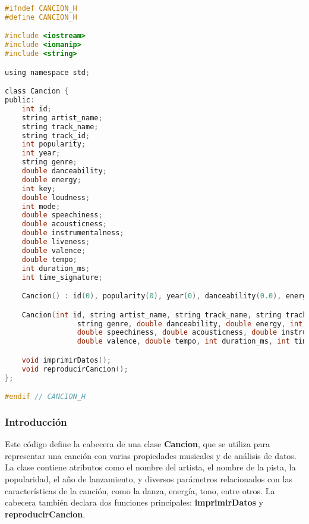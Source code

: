 \documentclass[corference]{IEEEtran}
\begin{document}
\begin{flushleft}
            \begin{lstlisting}[language=C, style=mystyle, caption={Cabecera de la Clase Canción}]
#ifndef CANCION_H
#define CANCION_H

#include <iostream>
#include <iomanip>
#include <string>

using namespace std;

class Cancion {
public:
    int id;
    string artist_name;
    string track_name;
    string track_id;
    int popularity;
    int year;
    string genre;
    double danceability;
    double energy;
    int key;
    double loudness;
    int mode;
    double speechiness;
    double acousticness;
    double instrumentalness;
    double liveness;
    double valence;
    double tempo;
    int duration_ms;
    int time_signature;

    Cancion() : id(0), popularity(0), year(0), danceability(0.0), energy(0.0), key(0), loudness(0.0), mode(0), speechiness(0.0), acousticness(0.0), instrumentalness(0.0), liveness(0.0), valence(0.0), tempo(0.0), duration_ms(0), time_signature(0) {}

    Cancion(int id, string artist_name, string track_name, string track_id, int popularity, int year,
                 string genre, double danceability, double energy, int key, double loudness, int mode,
                 double speechiness, double acousticness, double instrumentalness, double liveness,
                 double valence, double tempo, int duration_ms, int time_signature);

    void imprimirDatos();
    void reproducirCancion();
};

#endif // CANCION_H
            \end{lstlisting}

            \subsubsection{Introducción}
            
                \noindent\hspace*{4em}Este código define la cabecera de una clase \textbf{Cancion}, que se utiliza para representar una canción con varias propiedades musicales y de análisis de datos. La clase contiene atributos como el nombre del artista, el nombre de la pista, la popularidad, el año de lanzamiento, y diversos parámetros relacionados con las características de la canción, como la danza, energía, tono, entre otros. La cabecera también declara dos funciones principales: \textbf{imprimirDatos} y \textbf{reproducirCancion}.
            

\end{flushleft}
\end{document}
